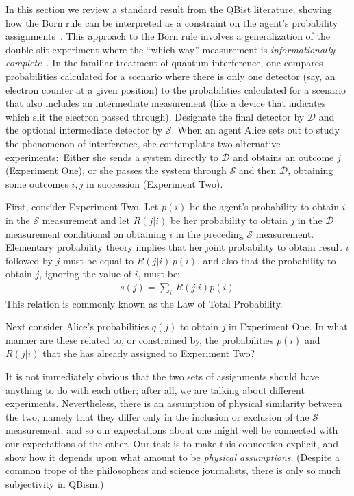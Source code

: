 \documentclass[%
 reprint,superscriptaddress,
 amsmath,amssymb,
 aps,pra, onecolumn, 12pt
]{revtex4-2}
\newcommand{\eqn}[1]{\begin{eqnarray} #1 \end{eqnarray}}
\newcommand{\tit}[1]{\textit{#1}}
\newcommand{\zum}[2]{\displaystyle\sum_{#1}^{#2}}
\newcommand{\onestage}{{One}}
\newcommand{\twostage}{{Two}}
\begin{document}
In this section we review a standard result from the QBist literature, showing how the Born rule can be interpreted as a constraint on the agent's probability assignments~\cite{Fuchs13a,Fuchs15b}. This approach to the Born rule involves a generalization of the double-slit experiment where the ``which way'' measurement is \tit{informationally complete}~\cite{DeBrota20a,DeBrota21}. In the familiar treatment of quantum interference, one compares probabilities calculated for a scenario where there is only one detector (say, an electron counter at a given position) to the probabilities calculated for a scenario that also includes an intermediate measurement (like a device that indicates which slit the electron passed through). Designate the final detector by $\mathcal{D}$ and the optional intermediate detector by $\mathcal{S}$. When an agent Alice sets out to study the phenomenon of interference, she contemplates two alternative experiments:\ Either she sends a system directly to $\mathcal{D}$ and obtains an outcome $j$ (Experiment \onestage), or she passes the system through $\mathcal{S}$ and then $\mathcal{D}$, obtaining some outcomes $i,j$ in succession (Experiment \twostage).

First, consider Experiment \twostage. Let $p(i)$ be the agent's probability to obtain $i$ in the $\mathcal{S}$ measurement and let $R(j|i)$ be her probability to obtain $j$ in the $\mathcal{D}$ measurement conditional on obtaining $i$ in the preceding $\mathcal{S}$ measurement. Elementary probability theory implies that her joint probability to obtain result $i$ followed by $j$ must be equal to $R(j|i)\, p(i)$, and also that the probability to obtain $j$, ignoring the value of $i$, must be:
\eqn{
s(j) = \zum{i}{}\, R(j|i)p(i) \,
}
This relation is commonly known as the Law of Total Probability.

Next consider Alice's probabilities $q(j)$ to obtain $j$ in Experiment \onestage. In what manner are these related to, or constrained by, the probabilities $p(i)$ and $R(j|i)$ that she has already assigned to Experiment \twostage?

It is not immediately obvious that the two sets of assignments should have anything to do with each other; after all, we are talking about different experiments. Nevertheless, there is an assumption of physical similarity between the two, namely that they differ only in the inclusion or exclusion of the $\mathcal{S}$ measurement, and so our expectations about one might well be connected with our expectations of the other. Our task is to make this connection explicit, and show how it depends upon what amount to be \tit{physical assumptions}.  (Despite a common trope of the philosophers and science journalists, there is only so much subjectivity in QBism.)
\end{document}
